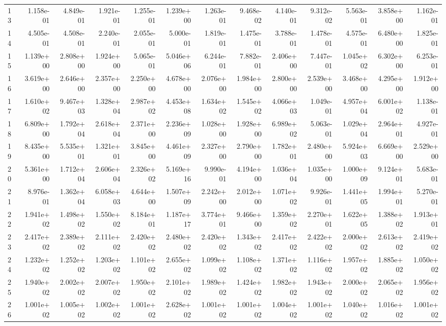 \begin{table}
\begin{tabular}{lrrrrrrrrrrrr}
13 & 1.158e-01 & 4.849e-01 & 1.921e-01 & 1.255e-01 & 1.239e+00 & 1.263e-01 & 9.468e-02 & 4.140e-01 & 9.312e-02 & 5.563e-01 & 3.858e+00 & 1.162e-01 \\
14 & 4.505e-01 & 4.508e-01 & 2.240e-01 & 2.055e-01 & 5.000e-01 & 1.819e-01 & 1.475e-01 & 3.788e-01 & 1.478e-01 & 4.575e-01 & 6.480e+00 & 1.825e-01 \\
15 & 1.139e+00 & 2.808e+00 & 1.924e+00 & 5.065e-01 & 5.046e+06 & 6.244e-01 & 7.882e-01 & 2.406e+00 & 7.447e-01 & 1.045e+02 & 6.302e+00 & 6.253e-01 \\
16 & 3.619e+00 & 2.646e+00 & 2.357e+00 & 2.250e+00 & 4.678e+00 & 2.076e+00 & 1.984e+00 & 2.800e+00 & 2.539e+00 & 3.468e+00 & 4.295e+00 & 1.912e+00 \\
17 & 1.610e+02 & 9.467e+03 & 1.328e+04 & 2.987e+02 & 4.453e+08 & 1.634e+02 & 1.545e+02 & 4.066e+03 & 1.049e-01 & 4.957e+04 & 6.001e+02 & 1.138e-01 \\
18 & 6.809e+00 & 1.792e+04 & 2.618e+04 & 2.371e+00 & 2.236e+09 & 1.028e+00 & 1.928e+00 & 6.989e+02 & 5.063e-01 & 1.029e+04 & 2.964e+01 & 4.927e-01 \\
19 & 8.435e+00 & 5.535e+01 & 1.321e+01 & 3.845e+00 & 4.461e+09 & 2.327e+00 & 2.790e+00 & 1.782e+01 & 2.480e+00 & 5.924e+03 & 6.669e+00 & 2.529e+00 \\
20 & 5.361e+00 & 1.712e+04 & 2.606e+04 & 2.326e+02 & 5.169e+16 & 9.990e-01 & 4.194e+00 & 1.036e+04 & 1.035e+00 & 1.000e+09 & 9.124e+01 & 5.683e-01 \\
21 & 8.976e-01 & 1.362e+04 & 6.058e+03 & 4.644e+00 & 1.507e+09 & 2.242e+00 & 2.012e+00 & 1.071e+02 & 9.926e-01 & 1.441e+05 & 1.994e+01 & 5.270e-01 \\
22 & 1.941e+02 & 1.498e+02 & 1.550e+02 & 8.184e+01 & 1.187e+17 & 3.774e+01 & 9.466e+00 & 1.359e+02 & 2.270e+01 & 1.622e+05 & 1.388e+02 & 1.913e+01 \\
23 & 2.417e+02 & 2.389e+02 & 2.111e+02 & 2.420e+02 & 2.480e+02 & 2.420e+02 & 1.343e+02 & 2.417e+02 & 2.422e+02 & 2.000e+02 & 2.613e+02 & 2.419e+02 \\
24 & 1.232e+02 & 1.252e+02 & 1.203e+02 & 1.101e+02 & 2.655e+02 & 1.099e+02 & 1.108e+02 & 1.371e+02 & 1.116e+02 & 1.957e+02 & 1.885e+02 & 1.050e+02 \\
25 & 1.940e+02 & 2.002e+02 & 2.007e+02 & 1.950e+02 & 2.101e+02 & 1.989e+02 & 1.424e+02 & 1.982e+02 & 1.943e+02 & 2.000e+02 & 2.065e+02 & 1.956e+02 \\
26 & 1.001e+02 & 1.005e+02 & 1.002e+02 & 1.001e+02 & 2.628e+02 & 1.001e+02 & 1.001e+02 & 1.004e+02 & 1.001e+02 & 1.040e+02 & 1.016e+02 & 1.001e+02 \\

\end{tabular}
\end{table}
